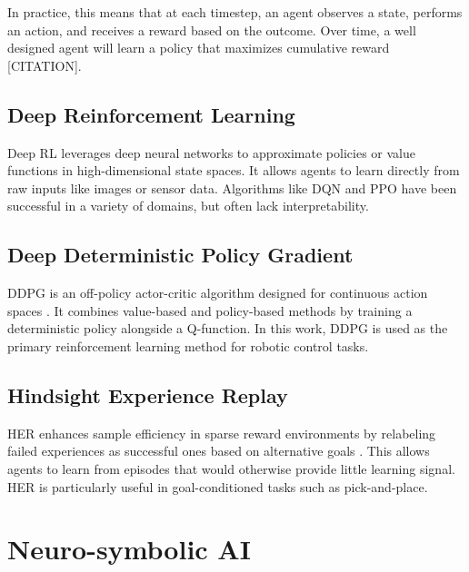 In practice, this means that at each timestep, an agent observes a state, performs an action, and receives a reward based on the outcome.
Over time, a well designed agent will learn a policy that maximizes cumulative reward [CITATION].

\subsection{Deep Reinforcement Learning} \label{ss:deep_reinforcement_learning}
Deep RL leverages deep neural networks to approximate policies or value functions in high-dimensional state spaces. It allows agents to learn directly from raw inputs like images or sensor data. Algorithms like DQN and PPO have been successful in a variety of domains, but often lack interpretability.

\subsection{Deep Deterministic Policy Gradient} \label{ss:deep_deterministic_policy_gradient}
DDPG is an off-policy actor-critic algorithm designed for continuous action spaces \cite{lillicrap2019continuouscontroldeepreinforcement}. It combines value-based and policy-based methods by training a deterministic policy alongside a Q-function. In this work, DDPG is used as the primary reinforcement learning method for robotic control tasks.

\subsection{Hindsight Experience Replay} \label{ss:hindsight_experience_replay}
HER enhances sample efficiency in sparse reward environments by relabeling failed experiences as successful ones based on alternative goals \cite{andrychowicz2018hindsightexperiencereplay}. This allows agents to learn from episodes that would otherwise provide little learning signal. HER is particularly useful in goal-conditioned tasks such as pick-and-place.

\section{Neuro-symbolic AI} \label{se:neurosymbolic_ai}

